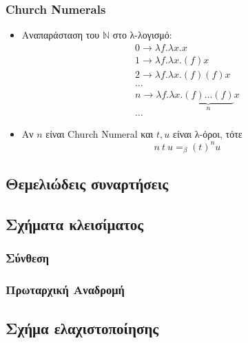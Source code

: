 \documentclass{beamer}
\begin{document}
\begin{frame}
        \frametitle{Church Numerals}
        \begin{itemize}
                \item Αναπαράσταση του \( \mathbb{N} \) στο λ-λογισμό:
                \pause
	        	\[ \begin{array}{l}
	        		0 \rightarrow \lambda f . \lambda x . x \\
	        		1 \rightarrow \lambda f . \lambda x . (f) x \\
	        		2 \rightarrow \lambda f . \lambda x . (f) (f) x \\
	        		\ldots \\
	        		n \rightarrow \lambda f . \lambda x . \underbrace{(f) \ldots (f)}_n x \\
	        		\ldots
	        	\end{array} \]
	        	\pause
                \item Αν \(n \) είναι Church Numeral και \(t, u\) είναι λ-όροι, τότε
                \[ n\:t\:u =_\beta (t)^n u \]
        \end{itemize}
\end{frame}

\subsection{Θεμελιώδεις συναρτήσεις}
\subsection{Σχήματα κλεισίματος}
\subsubsection{Σύνθεση}
\subsubsection{Πρωταρχική Αναδρομή}
\subsection{Σχήμα ελαχιστοποίησης}
\end{document}
